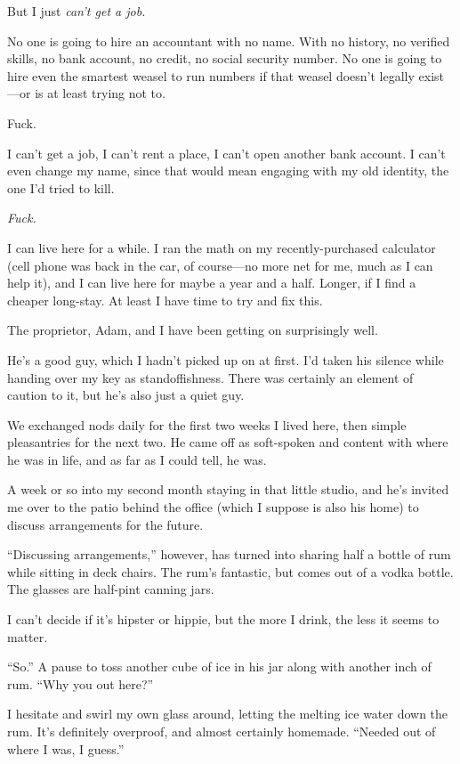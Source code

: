 But I just \emph{can't get a job.}

No one is going to hire an accountant with no name. With no history, no verified skills, no bank account, no credit, no social security number. No one is going to hire even the smartest weasel to run numbers if that weasel doesn't legally exist---or is at least trying not to.

Fuck.

I can't get a job, I can't rent a place, I can't open another bank account. I can't even change my name, since that would mean engaging with my old identity, the one I'd tried to kill.

\emph{Fuck.}

I can live here for a while. I ran the math on my recently-purchased calculator (cell phone was back in the car, of course---no more net for me, much as I can help it), and I can live here for maybe a year and a half. Longer, if I find a cheaper long-stay. At least I have time to try and fix this.

\secdiv{}

\noindent The proprietor, Adam, and I have been getting on surprisingly well.

He's a good guy, which I hadn't picked up on at first. I'd taken his silence while handing over my key as standoffishness. There was certainly an element of caution to it, but he's also just a quiet guy.

We exchanged nods daily for the first two weeks I lived here, then simple pleasantries for the next two. He came off as soft-spoken and content with where he was in life, and as far as I could tell, he was.

A week or so into my second month staying in that little studio, and he's invited me over to the patio behind the office (which I suppose is also his home) to discuss arrangements for the future.

``Discussing arrangements,'' however, has turned into sharing half a bottle of rum while sitting in deck chairs. The rum's fantastic, but comes out of a vodka bottle. The glasses are half-pint canning jars.

I can't decide if it's hipster or hippie, but the more I drink, the less it seems to matter.

``So.'' A pause to toss another cube of ice in his jar along with another inch of rum. ``Why you out here?''

I hesitate and swirl my own glass around, letting the melting ice water down the rum. It's definitely overproof, and almost certainly homemade. ``Needed out of where I was, I guess.''

